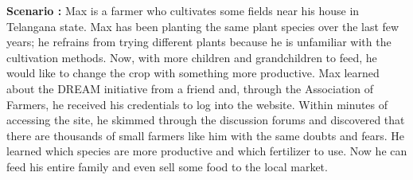 \begin{flushleft}
\textbf{Scenario :} 
Max is a farmer who cultivates some fields near his house in Telangana state. Max has been planting the same plant species over the last few years; he refrains from trying different plants because he is unfamiliar with the cultivation methods. Now, with more children and grandchildren to feed, he would like to change the crop with something more productive. Max learned about the DREAM initiative from a friend and, through the Association of Farmers, he received his credentials to log into the website.
Within minutes of accessing the site, he skimmed through the discussion forums and discovered that there are thousands of small farmers like him with the same doubts and fears. He learned which species are more productive and which fertilizer to use. Now he can feed his entire family and even sell some food to the local market.
\end{flushleft}